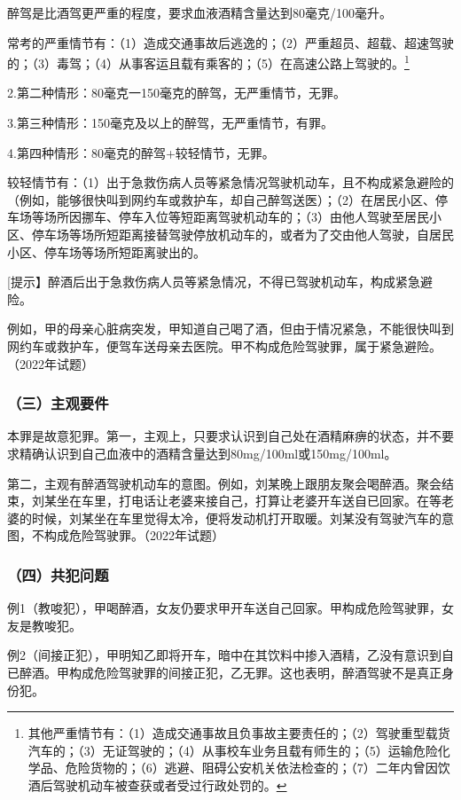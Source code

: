 醉驾是比酒驾更严重的程度，要求血液酒精含量达到80毫克/100毫升。

常考的严重情节有：（1）造成交通事故后逃逸的；（2）严重超员、超载、超速驾驶的；（3）毒驾；（4）从事客运且载有乘客的；（5）在高速公路上驾驶的。\footnote{其他严重情节有：（1）造成交通事故且负事故主要责任的；（2）驾驶重型载货汽车的；（3）无证驾驶的；（4）从事校车业务且载有师生的；（5）运输危险化学品、危险货物的；（6）逃避、阻碍公安机关依法检查的；（7）二年内曾因饮酒后驾驶机动车被查获或者受过行政处罚的。}

2.第二种情形：80毫克一150毫克的醉驾，无严重情节，无罪。

3.第三种情形：150毫克及以上的醉驾，无严重情节，有罪。

4.第四种情形：80毫克的醉驾+较轻情节，无罪。

较轻情节有：（1）出于急救伤病人员等紧急情况驾驶机动车，且不构成紧急避险的（例如，能够很快叫到网约车或救护车，却自己醉驾送医）；（2）在居民小区、停车场等场所因挪车、停车入位等短距离驾驶机动车的；（3）由他人驾驶至居民小区、停车场等场所短距离接替驾驶停放机动车的，或者为了交由他人驾驶，自居民小区、停车场等场所短距离驶出的。

[提示】醉酒后出于急救伤病人员等紧急情况，不得已驾驶机动车，构成紧急避险。

例如，甲的母亲心脏病突发，甲知道自己喝了酒，但由于情况紧急，不能很快叫到网约车或救护车，便驾车送母亲去医院。甲不构成危险驾驶罪，属于紧急避险。（2022年试题）

\subsubsection*{（三）主观要件}

本罪是故意犯罪。第一，主观上，只要求认识到自己处在酒精麻痹的状态，并不要求精确认识到自己血液中的酒精含量达到80mg/100ml或150mg/100ml。

第二，主观有醉酒驾驶机动车的意图。例如，刘某晚上跟朋友聚会喝醉酒。聚会结束，刘某坐在车里，打电话让老婆来接自己，打算让老婆开车送自已回家。在等老婆的时候，刘某坐在车里觉得太冷，便将发动机打开取暖。刘某没有驾驶汽车的意图，不构成危险驾驶罪。（2022年试题）

\subsubsection*{（四）共犯问题}

例1（教唆犯），甲喝醉酒，女友仍要求甲开车送自己回家。甲构成危险驾驶罪，女友是教唆犯。

例2（间接正犯），甲明知乙即将开车，暗中在其饮料中掺入酒精，乙没有意识到自已醉酒。甲构成危险驾驶罪的间接正犯，乙无罪。这也表明，醉酒驾驶不是真正身份犯。

